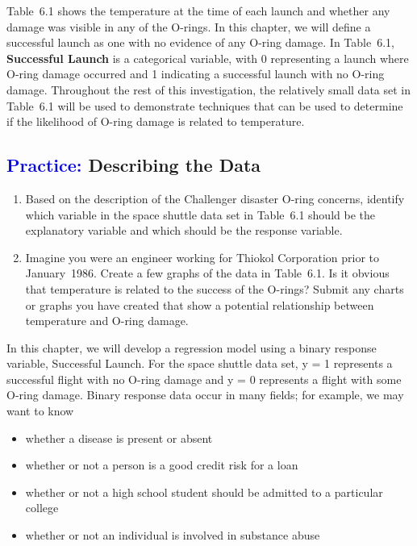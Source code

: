\documentclass[
]{report}
\providecommand{\tightlist}{%
  \setlength{\itemsep}{0pt}\setlength{\parskip}{0pt}}
\begin{document}
Table~6.1 shows the temperature at the time of each launch and whether any damage was visible in any of the O-rings. In this chapter, we will define a successful launch as one with no evidence of any O-ring damage. In Table~6.1, \textbf{Successful Launch} is a categorical variable, with 0 representing a launch where O-ring damage occurred and 1 indicating a successful launch with no O-ring damage. Throughout the rest of this investigation, the relatively small data set in Table~6.1 will be used to demonstrate techniques that can be used to determine if the likelihood of O-ring damage is related to temperature.

\hypertarget{describing-the-data-1}{%
\subsection*{\texorpdfstring{\textcolor{blue}{Practice:} Describing the Data}{ Describing the Data}}\label{describing-the-data-1}}

\begin{enumerate}
\def\labelenumi{\arabic{enumi}.}
\item
  Based on the description of the Challenger disaster O-ring concerns, identify which variable in the space shuttle data set in Table~6.1 should be the explanatory variable and which should be the response variable.
\item
  Imagine you were an engineer working for Thiokol Corporation prior to January~1986. Create a few graphs of the data in Table~6.1. Is it obvious that temperature is related to the success of the O-rings? Submit any charts or graphs you have created that show a potential relationship between temperature and O-ring damage.
\end{enumerate}

In this chapter, we will develop a regression model using a binary response variable, Successful Launch. For the space shuttle data set, y = 1 represents a successful flight with no O-ring damage and y = 0 represents a flight with some O-ring damage. Binary response data occur in many fields; for example, we may want to know

\begin{itemize}
\tightlist
\item
  whether a disease is present or absent
\item
  whether or not a person is a good credit risk for a loan
\item
  whether or not a high school student should be admitted to a particular college
\item
  whether or not an individual is involved in substance abuse
\end{itemize}
\end{document}
